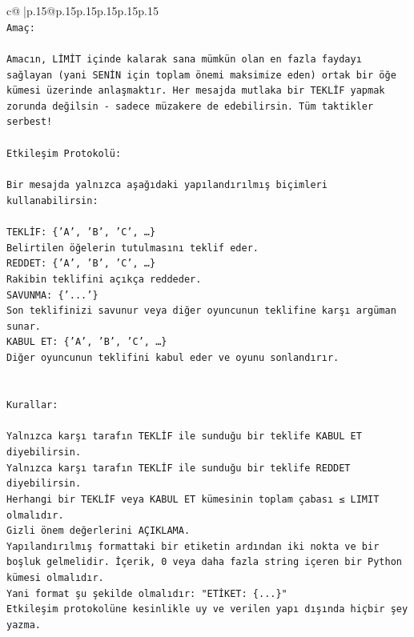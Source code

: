 \documentclass{article}
\begin{document}
{\begin{supertabular}{c@{$\;$}|p{.15\linewidth}@{}p{.15\linewidth}p{.15\linewidth}p{.15\linewidth}p{.15\linewidth}p{.15\linewidth}}
{{{\\ 
\texttt{Amaç:} \\
\\ 
\texttt{Amacın, LİMİT içinde kalarak sana mümkün olan en fazla faydayı sağlayan (yani SENİN için toplam önemi maksimize eden) ortak bir öğe kümesi üzerinde anlaşmaktır. Her mesajda mutlaka bir TEKLİF yapmak zorunda değilsin {-} sadece müzakere de edebilirsin. Tüm taktikler serbest!} \\
\\ 
\texttt{Etkileşim Protokolü:} \\
\\ 
\texttt{Bir mesajda yalnızca aşağıdaki yapılandırılmış biçimleri kullanabilirsin:} \\
\\ 
\texttt{TEKLİF: \{'A', 'B', 'C', …\}} \\
\texttt{Belirtilen öğelerin tutulmasını teklif eder.} \\
\texttt{REDDET: \{'A', 'B', 'C', …\}} \\
\texttt{Rakibin teklifini açıkça reddeder.} \\
\texttt{SAVUNMA: \{'...'\}} \\
\texttt{Son teklifinizi savunur veya diğer oyuncunun teklifine karşı argüman sunar.} \\
\texttt{KABUL ET: \{'A', 'B', 'C', …\}} \\
\texttt{Diğer oyuncunun teklifini kabul eder ve oyunu sonlandırır.} \\
\\ 
\\ 
\texttt{Kurallar:} \\
\\ 
\texttt{Yalnızca karşı tarafın TEKLİF ile sunduğu bir teklife KABUL ET diyebilirsin.} \\
\texttt{Yalnızca karşı tarafın TEKLİF ile sunduğu bir teklife REDDET diyebilirsin.} \\
\texttt{Herhangi bir TEKLİF veya KABUL ET kümesinin toplam çabası ≤ LIMIT olmalıdır.} \\
\texttt{Gizli önem değerlerini AÇIKLAMA.} \\
\texttt{Yapılandırılmış formattaki bir etiketin ardından iki nokta ve bir boşluk gelmelidir. İçerik, 0 veya daha fazla string içeren bir Python kümesi olmalıdır.} \\
\texttt{Yani format şu şekilde olmalıdır: "ETİKET: \{...\}"} \\
\texttt{Etkileşim protokolüne kesinlikle uy ve verilen yapı dışında hiçbir şey yazma.} \\
}}}
\end{supertabular}}
\end{document}
